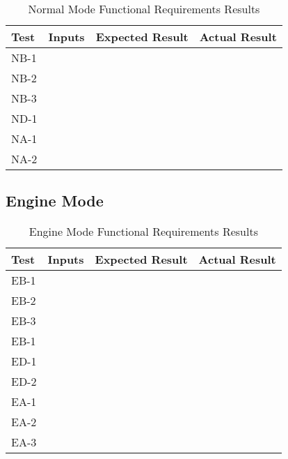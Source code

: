 \documentclass[12pt, titlepage]{article}
\begin{document}
\begin{table}[H]
  \centering
    \setlength{\leftmargini}{0cm}
    \begin{tabular}{| >{\centering\arraybackslash}m{1.5cm} | 
      >{\centering\arraybackslash}m{4cm} | 
      >{\centering\arraybackslash}m{4cm} | 
      >{\centering\arraybackslash}m{4cm} |}
    \hline
    \rowcolor[gray]{0.9}
    Test & Inputs & Expected Result & Actual Result\\
    \hline
    NB-1 &  &  & \\
    \hline
    NB-2 &  &  & \\
    \hline
    NB-3 &  &  & \\
    \hline
    ND-1 &  &  & \\
    \hline
    NA-1 &  &  & \\
    \hline
    NA-2 &  &  & \\
    \hline
    \end{tabular}
  \caption{Normal Mode Functional Requirements Results}
\end{table}

\subsection{Engine Mode}

\begin{table}[H]
  \centering
    \setlength{\leftmargini}{0cm}
    \begin{tabular}{| >{\centering\arraybackslash}m{1.5cm} | 
      >{\centering\arraybackslash}m{4cm} | 
      >{\centering\arraybackslash}m{4cm} | 
      >{\centering\arraybackslash}m{4cm} |}
    \hline
    \rowcolor[gray]{0.9}
    Test & Inputs & Expected Result & Actual Result\\
    \hline
    EB-1 &  &  & \\
    \hline
    EB-2 &  &  & \\
    \hline
    EB-3 &  &  & \\
    \hline
    EB-1 &  &  & \\
    \hline
    ED-1 &  &  & \\
    \hline
    ED-2 &  &  & \\
    \hline
    EA-1 &  &  & \\
    \hline
    EA-2 &  &  & \\
    \hline
    EA-3 &  &  & \\
    \hline
    \end{tabular}
  \caption{Engine Mode Functional Requirements Results}
\end{table}
\end{document}
